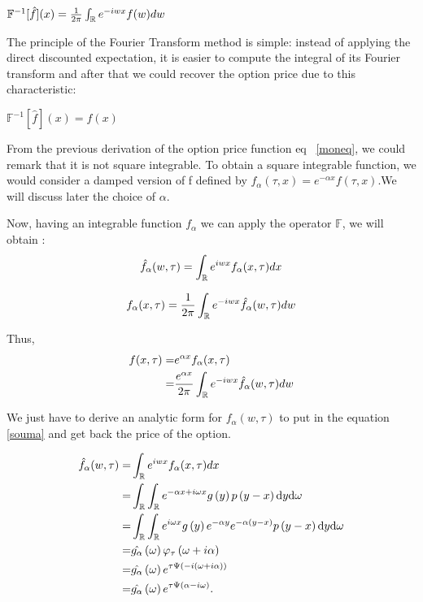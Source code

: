 \documentclass[12pt]{report}
\begin{document}
\begin{center}
$\mathbb{F}^{-1}[\hat{f}] (x) =\frac{1}{2\pi}\int_{\mathbb{R}} e^{-iwx}f(w) dw $
\end{center}


The principle of the Fourier Transform method is simple: instead of applying the direct discounted expectation, it is easier to compute the integral of its Fourier transform and after that we could recover the option price due to this characteristic:
\begin{center}
$\mathbb{F}^{-1}[\hat{f}] (x)=f(x)$

\end{center} 


From the previous derivation of the option price function eq ~\eqref{moneq}, we could remark that it is not square integrable. To obtain a square integrable function, we would consider a damped version of f defined by $f_{\alpha}(\tau,x) = e^{-\alpha x}f(\tau, x)$.We will discuss later  the choice of $\alpha$.

Now, having an integrable function $f_\alpha$ we can apply the operator $\mathbb{F}$, we will obtain :
\begin{gather}
\hat{f}_{\alpha}(w,\tau)=\int_{\mathbb{R}} e^{iwx} f_{\alpha}(x,\tau) dx 
\end{gather}


\begin{equation}
f_{\alpha}(x,\tau)=\frac{1}{2\pi}\int_{\mathbb{R}} e^{-iwx}\hat{f}_{\alpha}(w,\tau) dw
\end{equation}

Thus,\\
\begin{align}
f(x,\tau)= & e^{\alpha x} f_{\alpha}(x,\tau)\\
= & \frac{e^{\alpha x}}{2\pi}\int_{\mathbb{R}} e^{-iwx}\hat{f}_{\alpha}(w,\tau) dw
\label{souma}
\end{align}

We just have to derive an analytic form for $f_\alpha(w,\tau)$ to put in the equation \eqref{souma} and get back the price of the option.

\begin{align*}
\hat{f}_{\alpha}(w,\tau)= &\int_{\mathbb{R}} e^{iwx} f_{\alpha}(x,\tau) dx
\\
= &  \int_{\mathbb{R}} \int_{\mathbb{R}} e^{- \alpha x + i \omega x} g \left( {y} \right)  p \left( {y-x} \right) \textrm{d} y \textrm{d} \omega
\\
= & \int_{\mathbb{R}} \int_{\mathbb{R}} e^{ i \omega x} g \left( {y} \right) e^{-\alpha y} e^{-\alpha \left( {y
-x} \right)}  p \left( {y-x} \right) \textrm{d} y \textrm{d} \omega
\\
= &\hat {g_{\alpha}} \left( {\omega} \right) \varphi_{\tau} \left( {{\omega + i \alpha}} \right)
\\
= & \hat {g_{\alpha}} \left( {\omega} \right) e^{\tau \Psi \left( {{-i \left( {\omega+i \alpha} \right)}} \right) }
\\
= & \hat {g_{\alpha}} \left( {\omega} \right) e^{\tau \Psi \left( {{\alpha - i \omega}} \right) }.
\end{align*}
\end{document}
